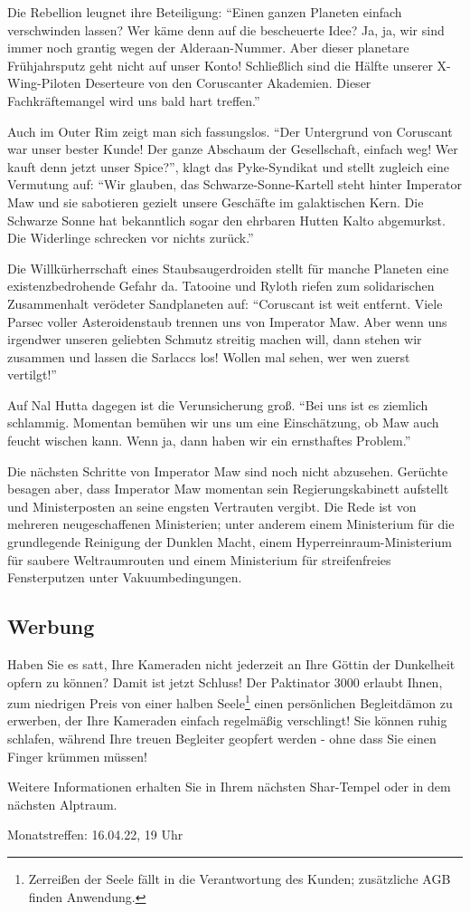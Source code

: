 \documentclass[final]{multiversum}
\begin{document}
Die Rebellion leugnet ihre Beteiligung: \enquote{Einen ganzen Planeten einfach verschwinden lassen? 
Wer käme denn auf die bescheuerte Idee? 
Ja, ja, wir sind immer noch grantig wegen der Alderaan-Nummer. 
Aber dieser planetare Frühjahrsputz geht nicht auf unser Konto! 
Schließlich sind die Hälfte unserer X-Wing-Piloten Deserteure von den Coruscanter Akademien. 
Dieser Fachkräftemangel wird uns bald hart treffen.}

Auch im Outer Rim zeigt man sich fassungslos. 
\enquote{Der Untergrund von Coruscant war unser bester Kunde! 
Der ganze Abschaum der Gesellschaft, einfach weg! 
Wer kauft denn jetzt unser Spice?}, klagt das Pyke-Syndikat und stellt zugleich eine Vermutung auf: 
\enquote{Wir glauben, das Schwarze-Sonne-Kartell steht hinter Imperator Maw und sie sabotieren gezielt unsere Geschäfte im galaktischen Kern. 
Die Schwarze Sonne hat bekanntlich sogar den ehrbaren Hutten Kalto abgemurkst. 
Die Widerlinge schrecken vor nichts zurück.}

Die Willkürherrschaft eines Staubsaugerdroiden stellt für manche Planeten eine existenzbedrohende Gefahr da. 
Tatooine und Ryloth riefen zum solidarischen Zusammenhalt verödeter Sandplaneten auf: 
\enquote{Coruscant ist weit entfernt. 
Viele Parsec voller Asteroidenstaub trennen uns von Imperator Maw. 
Aber wenn uns irgendwer unseren geliebten Schmutz streitig machen will, dann stehen wir zusammen und lassen die Sarlaccs los! 
Wollen mal sehen, wer wen zuerst vertilgt!}

Auf Nal Hutta dagegen ist die Verunsicherung groß. 
\enquote{Bei uns ist es ziemlich schlammig. 
Momentan bemühen wir uns um eine Einschätzung, ob Maw auch feucht wischen kann. 
Wenn ja, dann haben wir ein ernsthaftes Problem.}

Die nächsten Schritte von Imperator Maw sind noch nicht abzusehen. 
Gerüchte besagen aber, dass Imperator Maw momentan sein Regierungskabinett aufstellt und Ministerposten an seine engsten Vertrauten vergibt. 
Die Rede ist von mehreren neugeschaffenen Ministerien; unter anderem einem Ministerium für die grundlegende Reinigung der Dunklen Macht, einem Hyperreinraum-Ministerium für saubere Weltraumrouten und einem Ministerium für streifenfreies Fensterputzen unter Vakuumbedingungen.

\subsection{Werbung}

Haben Sie es satt, Ihre Kameraden nicht jederzeit an Ihre Göttin der Dunkelheit opfern zu können? 
Damit ist jetzt Schluss! Der Paktinator 3000 erlaubt Ihnen, zum niedrigen Preis von einer halben Seele\footnote{Zerreißen der Seele fällt in die Verantwortung des Kunden; zusätzliche AGB finden Anwendung.} einen persönlichen Begleitdämon zu erwerben, der Ihre Kameraden einfach regelmäßig verschlingt! Sie können ruhig schlafen, während Ihre treuen Begleiter geopfert werden - ohne dass Sie einen Finger krümmen müssen! 

Weitere Informationen erhalten Sie in Ihrem nächsten Shar-Tempel oder in dem nächsten Alptraum. 

\begin{termine}
\item Monatstreffen: 16.04.22, 19 Uhr
\end{termine}
\impressum
\end{document}
